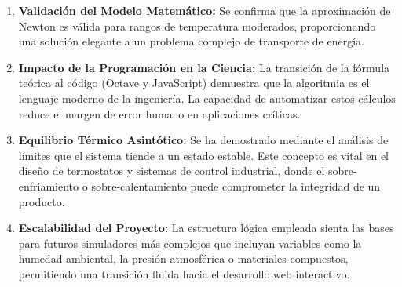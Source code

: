 \documentclass[12pt]{article}
\begin{document}
\begin{enumerate}
    \item \textbf{Validación del Modelo Matemático:} Se confirma que la aproximación de Newton es válida para rangos de temperatura moderados, proporcionando una solución elegante a un problema complejo de transporte de energía.
    
    \item \textbf{Impacto de la Programación en la Ciencia:} La transición de la fórmula teórica al código (Octave y JavaScript) demuestra que la algoritmia es el lenguaje moderno de la ingeniería. La capacidad de automatizar estos cálculos reduce el margen de error humano en aplicaciones críticas.
    
    \item \textbf{Equilibrio Térmico Asintótico:} Se ha demostrado mediante el análisis de límites que el sistema tiende a un estado estable. Este concepto es vital en el diseño de termostatos y sistemas de control industrial, donde el sobre-enfriamiento o sobre-calentamiento puede comprometer la integridad de un producto.
    
    \item \textbf{Escalabilidad del Proyecto:} La estructura lógica empleada sienta las bases para futuros simuladores más complejos que incluyan variables como la humedad ambiental, la presión atmosférica o materiales compuestos, permitiendo una transición fluida hacia el desarrollo web interactivo.
\end{enumerate}
\end{document}
